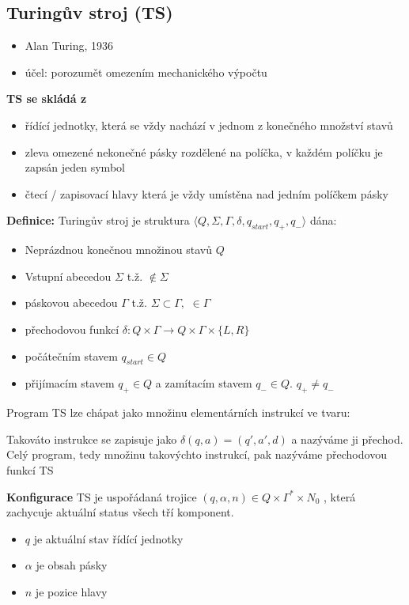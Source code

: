 \documentclass[10pt,a4paper]{article}
\theoremstyle{note}
\begin{document}
	\subsection{Turingův stroj (TS)}

		\begin{itemize}
			\item Alan Turing, 1936
			\item účel: porozumět omezením mechanického výpočtu
		\end{itemize}
		\textbf{TS se skládá z}
		\begin{itemize}
			\item řídící jednotky, která se vždy nachází v jednom z konečného množství stavů
			\item zleva omezené nekonečné pásky rozdělené na políčka, v každém políčku je zapsán jeden symbol
			\item čtecí / zapisovací hlavy která je vždy umístěna nad jedním políčkem pásky
		\end{itemize}
		\textbf{Definice: }
		Turingův stroj je struktura $\langle Q, \Sigma, \Gamma, \delta, q_{start}, q_{+}, q_{-} \rangle $ dána:
		\begin{itemize}
			\item Neprázdnou konečnou množinou stavů $Q$
			\item Vstupní abecedou  $\Sigma$ t.ž. \textvisiblespace $ \notin \Sigma$
			\item páskovou abecedou $\Gamma$ t.ž. $\Sigma \subset \Gamma,$ \textvisiblespace $\in  \Gamma $
			\item přechodovou funkcí $\delta : Q \times  \Gamma \rightarrow Q \times \Gamma \times \{L , R \} $
			\item počátečním stavem $q_{start} \in Q$
			\item přijímacím stavem $q_{+} \in Q $ a zamítacím stavem $q_{-} \in Q.$ $q_{+} \neq q_{-}$
		\end{itemize}
		Program TS lze chápat jako množinu elementárních instrukcí ve tvaru:

		\textit{}

		Takováto instrukce se zapisuje jako $\delta (q,a) = (q', a', d)$ a nazýváme ji přechod. Celý program, tedy množinu 				takovýchto instrukcí, pak nazýváme přechodovou funkcí TS

		\textbf{Konfigurace} TS je uspořádaná trojice $(q, \alpha, n) \in Q \times \Gamma^{*} \times N_{0}$ , která zachycuje
		aktuální status všech tří komponent.
		\begin{itemize}
			\item $q$ je aktuální stav řídící jednotky
			\item $\alpha$ je obsah pásky
			\item $n$ je pozice hlavy
		\end{itemize}
\end{document}
